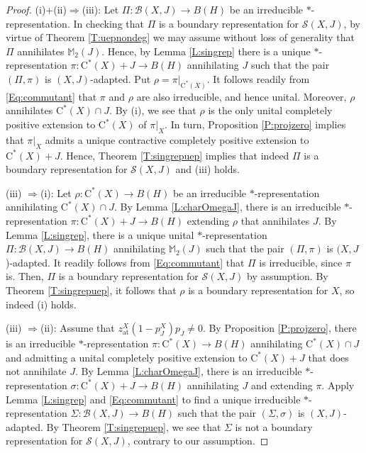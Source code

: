 \documentclass[10pt]{amsart}
\newcommand{\bM}{{\mathbb{M}}}
\newcommand{\B}{{\mathcal{B}}}
\renewcommand{\S}{{\mathcal{S}}}
\newcommand{\rC}{\mathrm{C}}
\newcommand{\at}{\operatorname{at}}
\theoremstyle{definition}
\begin{document}
\begin{proof}
(i)+(ii)$\Rightarrow$(iii): 
Let $\Pi:\B(X,J)\to B(H)$ be an irreducible $*$-representation. In checking that $\Pi$ is a boundary representation for $\S(X,J)$, by virtue of Theorem \ref{T:uepnondeg} we may assume without loss of generality that $\Pi$ annihilates $\bM_2(J)$. Hence, by Lemma \ref{L:singrep} there is a unique $*$-representation $\pi:\rC^*(X)+J\to B(H)$ annihilating $J$ such that the pair $(\Pi,\pi)$ is $(X,J)$-adapted. Put $\rho=\pi|_{\rC^*(X)}$. It follows readily from \eqref{Eq:commutant} that $\pi$ and $\rho$ are  also irreducible, and hence unital. Moreover, $\rho$ annihilates $ \rC^*(X)\cap J$.
By (i), we see that $\rho$ is the only unital completely positive extension to $\rC^*(X)$ of $\pi|_X$. In turn, Proposition \ref{P:projzero} implies that $\pi|_X$ admits a unique contractive completely positive extension to $\rC^*(X)+J$. Hence,  Theorem \ref{T:singrepuep} implies that indeed $\Pi$ is a boundary representation for $\S(X,J)$ and (iii) holds.

(iii) $\Rightarrow$(i): Let $\rho:\rC^*(X)\to B(H)$ be an irreducible $*$-representation annihilating $ \rC^*(X)\cap J$. By Lemma \ref{L:charOmegaJ}, there is an irreducible $*$-representation $\pi:\rC^*(X)+J\to B(H)$ extending $\rho$ that annihilates $J$. By Lemma \ref{L:singrep}, there is a unique unital $*$-representation $\Pi:\B(X,J)\to B(H)$ annihilating $\bM_2(J)$ such that the pair $(\Pi,\pi)$ is $(X,J$)-adapted. It readily follows from \eqref{Eq:commutant} that $\Pi$ is irreducible, since $\pi$ is. Then, $\Pi$ is a boundary representation for $\S(X,J)$ by assumption. By Theorem \ref{T:singrepuep}, it follows that $\rho$ is a boundary representation for $X$, so indeed (i) holds. 

(iii) $\Rightarrow$(ii):  Assume that $z^X_{\at}(1-p^X_J)p_J\neq 0$.  By Proposition \ref{P:projzero}, there is an irreducible $*$-representation $\pi:\rC^*(X)\to B(H)$ annihilating $\rC^*(X)\cap J$ and admitting a unital completely positive extension to $\rC^*(X)+J$ that does not annihilate $J$. By Lemma \ref{L:charOmegaJ}, there is an irreducible $*$-representation $\sigma:\rC^*(X)+J\to B(H)$ annihilating $J$ and extending $\pi$. Apply Lemma \ref{L:singrep} and \eqref{Eq:commutant} to find a unique irreducible $*$-representation $\Sigma:\B(X,J)\to B(H)$ such that the pair $(\Sigma,\sigma)$ is $(X,J)$-adapted. By Theorem \ref{T:singrepuep}, we see that $\Sigma$ is not a boundary representation for $\S(X,J)$, contrary to our assumption. 
\end{proof}
\end{document}
